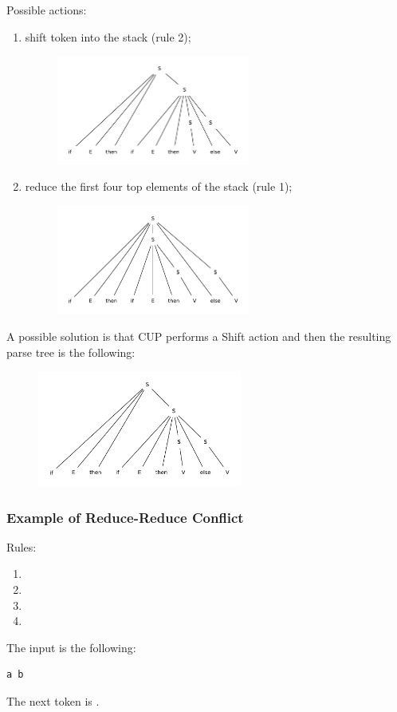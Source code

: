 Possible actions:
\begin{enumerate}
    \item
    shift  token into the stack (rule 2);
    \begin{figure}[H]
        \centerline{\includegraphics[width=0.6\textwidth]{img/21.pdf}}
    \end{figure}
    \item
    reduce the first four top elements of the stack (rule 1);
    \begin{figure}[H]
        \centerline{\includegraphics[width=0.6\textwidth]{img/22.pdf}}
    \end{figure}
\end{enumerate}

A possible solution is that CUP performs a Shift action and then the resulting parse tree is the following:
\begin{figure}[H]
    \centerline{\includegraphics[width=0.6\textwidth]{img/23.pdf}}
\end{figure}

\subsubsection{Example of Reduce-Reduce Conflict}
Rules:
\begin{enumerate}
    \item
    \item
    \item
    \item
\end{enumerate}
The input is the following:
\begin{lstlisting}
a b
\end{lstlisting}
The next token is .

